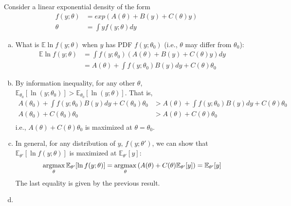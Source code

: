 \documentclass[11pt]{elegantbook}
\newcommand{\argmax}{\operatornamewithlimits{argmax}}
\begin{document}
\begin{example}
    Consider a linear exponential density of the form
    \begin{equation}
        \begin{aligned}
            f(y;\theta)&=exp\left(A(\theta)+B(y)+C(\theta)y\right)\\
            \theta&=\int yf(y;\theta)dy
        \end{aligned}
        \nonumber
    \end{equation}
\end{example}
\begin{enumerate}[(a).]
    \item What is $\mathbb{E} \ln f(y ; \theta)$ when $y$ has PDF $f(y ; \theta_0)$ (i.e., $\theta$ may differ from $\theta_0$):
    \begin{equation}
        \begin{aligned}
            \mathbb{E}\ln f(y;\theta)&=\int f(y ; \theta_0) \left(A(\theta)+B(y)+C(\theta)y\right)dy\\
            &=A(\theta)+\int f(y ; \theta_0)B(y)dy+C(\theta)\theta_0
        \end{aligned}
        \nonumber
    \end{equation}
    \item By information inequality, for any other $\theta$, $\mathbb{E}_{\theta_0}[\ln (y;\theta_0)]>\mathbb{E}_{\theta_0}[\ln (y;\theta)]$. That is,
    \begin{equation}
        \begin{aligned}
            A(\theta_0)+\int f(y ; \theta_0)B(y)dy+C(\theta_0)\theta_0&>A(\theta)+\int f(y ; \theta_0)B(y)dy+C(\theta)\theta_0\\
            A(\theta_0)+C(\theta_0)\theta_0&>A(\theta)+C(\theta)\theta_0\\
        \end{aligned}
        \nonumber
    \end{equation}
    i.e., $A(\theta)+C(\theta)\theta_0$ is maximized at $\theta=\theta_0$.
    \item In general, for any distribution of $y$, $f(y;\theta')$, we can show that $\mathbb{E}_{\theta'}[\ln f(y;\theta)]$ is maximized at $\mathbb{E}_{\theta'}[y]$:
    \begin{equation}
        \begin{aligned}
            \argmax_\theta \mathbb{E}_{\theta'}[\ln f(y;\theta)] = \argmax_\theta \left(A(\theta)+C(\theta)\mathbb{E}_{\theta'}[y]\right)=\mathbb{E}_{\theta'}[y]
        \end{aligned}
        \nonumber
    \end{equation}
    The last equality is given by the previous result.
    \item 
\end{enumerate}
\end{document}
